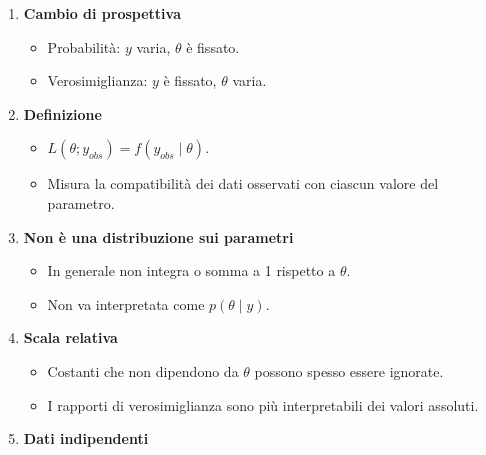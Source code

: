 \documentclass[
  italian,
  letterpaper,
  a4paper,
  11pt,
  open=any]{scrbook}
\providecommand{\tightlist}{%
  \setlength{\itemsep}{0pt}\setlength{\parskip}{0pt}}
\theoremstyle{plain}
\theoremstyle{definition}
\theoremstyle{definition}
\theoremstyle{remark}
\begin{document}
\begin{tcolorbox}[enhanced jigsaw, arc=.35mm, bottomrule=.15mm, bottomtitle=1mm, breakable, colback=white, colbacktitle=quarto-callout-important-color!10!white, colframe=quarto-callout-important-color-frame, coltitle=black, left=2mm, leftrule=.75mm, opacityback=0, opacitybacktitle=0.6, rightrule=.15mm, title=\textcolor{quarto-callout-important-color}{\faExclamation}\hspace{0.5em}{Importante}, titlerule=0mm, toprule=.15mm, toptitle=1mm]

\begin{enumerate}
\def\labelenumi{\arabic{enumi}.}
\tightlist
\item
  \textbf{Cambio di prospettiva}

  \begin{itemize}
  \tightlist
  \item
    Probabilità: \(y\) varia, \(\theta\) è fissato.
  \item
    Verosimiglianza: \(y\) è fissato, \(\theta\) varia.
  \end{itemize}
\item
  \textbf{Definizione}

  \begin{itemize}
  \tightlist
  \item
    \(L(\theta; y_{obs}) = f(y_{obs}\mid\theta)\).
  \item
    Misura la compatibilità dei dati osservati con ciascun valore del
    parametro.
  \end{itemize}
\item
  \textbf{Non è una distribuzione sui parametri}

  \begin{itemize}
  \tightlist
  \item
    In generale non integra o somma a 1 rispetto a \(\theta\).
  \item
    Non va interpretata come \(p(\theta \mid y)\).
  \end{itemize}
\item
  \textbf{Scala relativa}

  \begin{itemize}
  \tightlist
  \item
    Costanti che non dipendono da \(\theta\) possono spesso essere
    ignorate.
  \item
    I rapporti di verosimiglianza sono più interpretabili dei valori
    assoluti.
  \end{itemize}
\item
  \textbf{Dati indipendenti}


\end{enumerate}
\end{tcolorbox}
\end{document}

